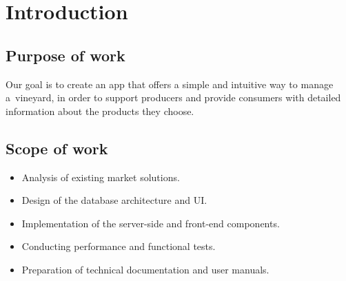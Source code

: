 \section{Introduction}
\subsection{Purpose of work}

Our goal is to create an app that offers a simple and intuitive way to manage a~vineyard, in order to support producers and provide consumers with detailed information about the products they choose.

\subsection{Scope of work}
\begin{itemize}
	\item Analysis of existing market solutions.
	
	\item Design of the database architecture and UI.
	
	\item Implementation of the server-side and front-end components.
	
	\item Conducting performance and functional tests.
	
	\item Preparation of technical documentation and user manuals.
\end{itemize}

